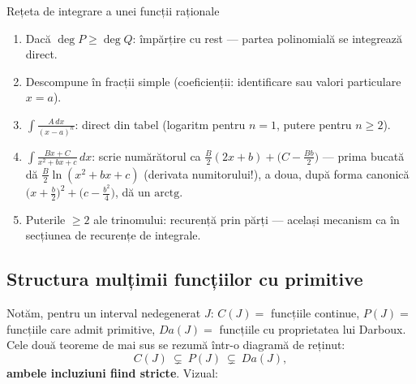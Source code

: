 \begin{tehbox}{Rețeta de integrare a unei funcții raționale}
\begin{enumerate}[leftmargin=*, itemsep=1pt]
\item Dacă $\deg P\ge\deg Q$: împărțire cu rest --- partea polinomială se integrează direct.
\item Descompune în fracții simple (coeficienții: identificare sau valori particulare $x=a$).
\item $\displaystyle\int\frac{A\,dx}{(x-a)^{n}}$: direct din tabel (logaritm pentru $n=1$, putere pentru $n\ge2$).
\item $\displaystyle\int\frac{Bx+C}{x^{2}+bx+c}\,dx$: scrie numărătorul ca $\frac B2(2x+b)+\big(C-\frac{Bb}{2}\big)$ --- prima bucată dă $\frac B2\ln(x^{2}+bx+c)$ (derivata numitorului!), a doua, după forma canonică $\big(x+\frac b2\big)^{2}+\big(c-\frac{b^{2}}4\big)$, dă un $\mathrm{arctg}$.
\item Puterile $\ge2$ ale trinomului: recurență prin părți --- același mecanism ca în secțiunea de recurențe de integrale.
\end{enumerate}
\end{tehbox}

\subsection{Structura mulțimii funcțiilor cu primitive}

Notăm, pentru un interval nedegenerat $J$: $C(J)=$ funcțiile continue, $P(J)=$ funcțiile care admit primitive, $Da(J)=$ funcțiile cu proprietatea lui Darboux. Cele două teoreme de mai sus se rezumă într-o diagramă de reținut:
\[
C(J)\ \subsetneq\ P(J)\ \subsetneq\ Da(J),
\]
\textbf{ambele incluziuni fiind stricte}. Vizual:

\begin{center}
\end{center}

